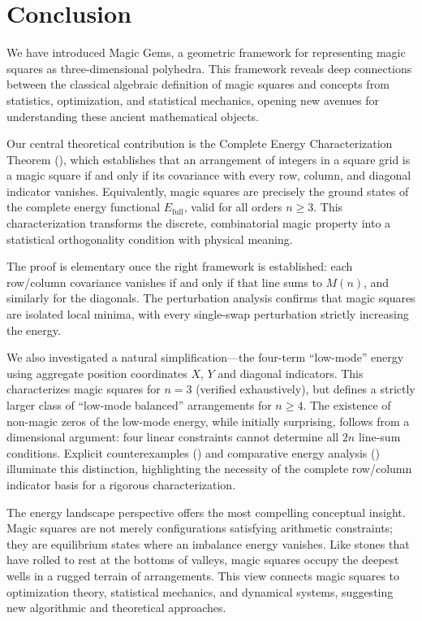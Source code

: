 \section{Conclusion}
\label{sec:conclusion}

We have introduced Magic Gems, a geometric framework for representing magic squares 
as three-dimensional polyhedra.
This framework reveals deep connections between the classical algebraic definition of magic squares
and concepts from statistics, optimization, and statistical mechanics,
opening new avenues for understanding these ancient mathematical objects.

Our central theoretical contribution is the Complete Energy Characterization Theorem 
(), which establishes that an arrangement of integers in a square grid 
is a magic square if and only if its covariance with every row, column, and diagonal indicator vanishes.
Equivalently, magic squares are precisely the ground states of the complete energy functional 
$E_{\mathrm{full}}$, valid for all orders $n \geq 3$.
This characterization transforms the discrete, combinatorial magic property
into a statistical orthogonality condition with physical meaning.

The proof is elementary once the right framework is established:
each row/column covariance vanishes if and only if that line sums to $M(n)$,
and similarly for the diagonals.
The perturbation analysis confirms that magic squares are isolated local minima,
with every single-swap perturbation strictly increasing the energy.

We also investigated a natural simplification---the four-term ``low-mode'' energy 
using aggregate position coordinates $X$, $Y$ and diagonal indicators.
This characterizes magic squares for $n = 3$ (verified exhaustively),
but defines a strictly larger class of ``low-mode balanced'' arrangements for $n \geq 4$.
The existence of non-magic zeros of the low-mode energy, while initially surprising,
follows from a dimensional argument: four linear constraints cannot determine 
all $2n$ line-sum conditions.
Explicit counterexamples () and comparative energy analysis ()
illuminate this distinction,
highlighting the necessity of the complete row/column indicator basis for a rigorous characterization.

The energy landscape perspective offers the most compelling conceptual insight.
Magic squares are not merely configurations satisfying arithmetic constraints;
they are equilibrium states where an imbalance energy vanishes.
Like stones that have rolled to rest at the bottoms of valleys,
magic squares occupy the deepest wells in a rugged terrain of arrangements.
This view connects magic squares to optimization theory, statistical mechanics, and dynamical systems,
suggesting new algorithmic and theoretical approaches.

